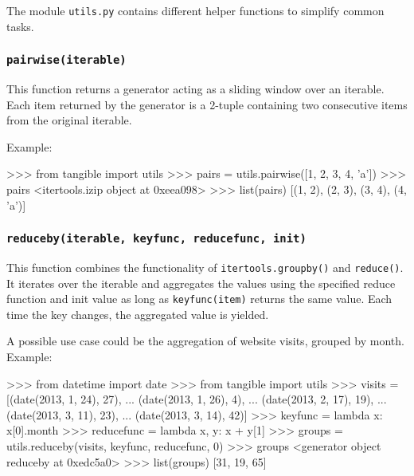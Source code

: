 The module \texttt{utils.py} contains different helper functions to simplify
common tasks.


\subsubsection{\texttt{pairwise(iterable)}}\label{subsec:architecture:pairwise}

\noindent This function returns a generator acting as a sliding window over an iterable.
Each item returned by the generator is a 2-tuple containing two consecutive
items from the original iterable.

\vspace{.5\baselineskip}

\noindent Example:

\vspace{.5\baselineskip}
\begin{pythoncode}
>>> from tangible import utils
>>> pairs = utils.pairwise([1, 2, 3, 4, 'a'])
>>> pairs
<itertools.izip object at 0xeea098>
>>> list(pairs)
[(1, 2), (2, 3), (3, 4), (4, 'a')]
\end{pythoncode}


\subsubsection{\texttt{reduceby(iterable, keyfunc, reducefunc, init)}}

This function combines the functionality of \texttt{itertools.groupby()} and
\texttt{reduce()}. It iterates over the iterable and aggregates the values using
the specified reduce function and init value as long as \texttt{keyfunc(item)}
returns the same value. Each time the key changes, the aggregated value is
yielded.

A possible use case could be the aggregation of website visits, grouped by
month. Example:

\vspace{.5\baselineskip}
\begin{pythoncode}
>>> from datetime import date
>>> from tangible import utils
>>> visits = [(date(2013, 1, 24), 27),
...           (date(2013, 1, 26), 4),
...           (date(2013, 2, 17), 19),
...           (date(2013, 3, 11), 23),
...           (date(2013, 3, 14), 42)]
>>> keyfunc = lambda x: x[0].month
>>> reducefunc = lambda x, y: x + y[1]
>>> groups = utils.reduceby(visits, keyfunc, reducefunc, 0)
>>> groups
<generator object reduceby at 0xedc5a0>
>>> list(groups)
[31, 19, 65]
\end{pythoncode}

